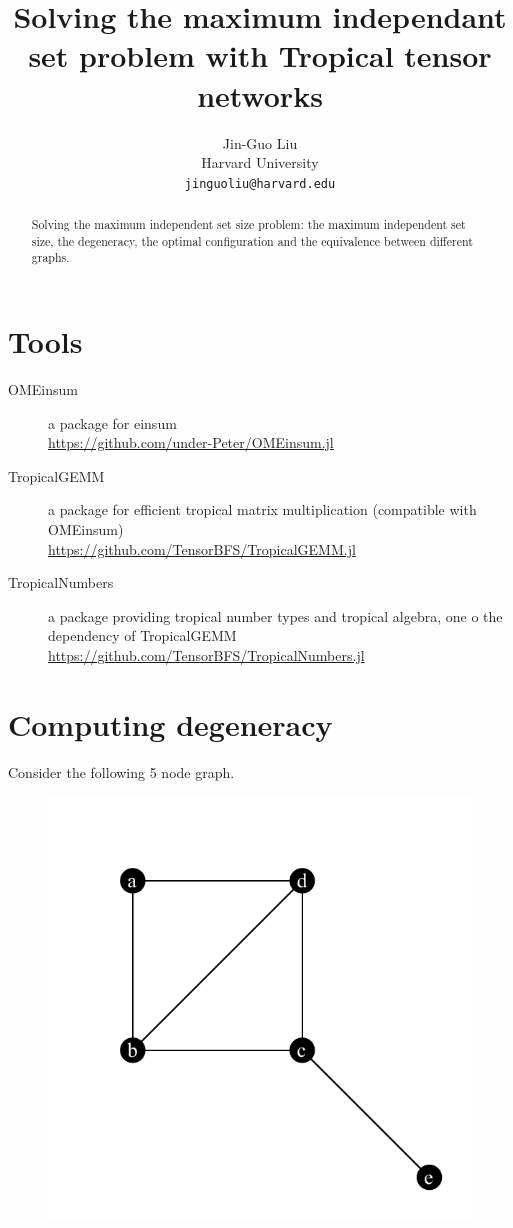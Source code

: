 \documentclass{article}
\newcommand{\<}{\langle}
\renewcommand{\>}{\rangle}
\theoremstyle{definition}\newtheorem{definition}{\textit{Definition}}
\begin{document}
\title{Solving the maximum independant set problem with Tropical tensor networks}

\author{Jin-Guo Liu\\
Harvard University\\
\texttt{jinguoliu@harvard.edu}\\
}
\maketitle

\begin{abstract}
	Solving the maximum independent set size problem: the maximum independent set size, the degeneracy, the optimal configuration and the equivalence between different graphs.
\end{abstract}

\section{Tools}
\begin{description}
	\item[OMEinsum] a package for einsum \\ \href{https://github.com/under-Peter/OMEinsum.jl}{https://github.com/under-Peter/OMEinsum.jl}
	\item[TropicalGEMM] a package for efficient tropical matrix multiplication (compatible with OMEinsum) \\ \href{https://github.com/TensorBFS/TropicalGEMM.jl}{https://github.com/TensorBFS/TropicalGEMM.jl}
	\item[TropicalNumbers] a package providing tropical number types and tropical algebra, one o the dependency of TropicalGEMM \\ \href{https://github.com/TensorBFS/TropicalNumbers.jl}{https://github.com/TensorBFS/TropicalNumbers.jl}
\end{description}

\section{Computing degeneracy}
Consider the following 5 node graph.

\begin{figure}[H]
    \centerline{\includegraphics[width=0.4\columnwidth,trim={0 0cm 0 0},clip]{../notebooks/fig1.pdf}}
\end{figure}
\end{document}
